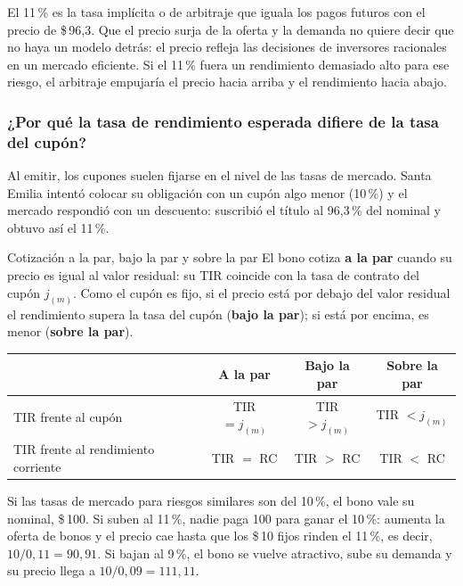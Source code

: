 El 11\,\% es la tasa implícita o de arbitraje que iguala los pagos futuros con el precio de \$\,96,3. Que el precio surja de la oferta y la demanda no quiere decir que no haya un modelo detrás: el precio refleja las decisiones de inversores racionales en un mercado eficiente. Si el 11\,\% fuera un rendimiento demasiado alto para ese riesgo, el arbitraje empujaría el precio hacia arriba y el rendimiento hacia abajo.

\subsubsection{¿Por qué la tasa de rendimiento esperada difiere de la tasa del cupón?}

Al emitir, los cupones suelen fijarse en el nivel de las tasas de mercado. Santa Emilia intentó colocar su obligación con un cupón algo menor (10\,\%) y el mercado respondió con un descuento: suscribió el título al 96,3\,\% del nominal y obtuvo así el 11\,\%.

\begin{definicion}{Cotización a la par, bajo la par y sobre la par}
El bono cotiza \textbf{a la par} cuando su precio es igual al valor residual: su TIR coincide con la tasa de contrato del cupón $j_{(m)}$. Como el cupón es fijo, si el precio está por debajo del valor residual el rendimiento supera la tasa del cupón (\textbf{bajo la par}); si está por encima, es menor (\textbf{sobre la par}).
\end{definicion}

\begin{center}
\small
\begin{tabular}{@{}lccc@{}}
\toprule
 & A la par & Bajo la par & Sobre la par\\
\midrule
TIR frente al cupón & TIR $= j_{(m)}$ & TIR $> j_{(m)}$ & TIR $< j_{(m)}$\\
TIR frente al rendimiento corriente & TIR $=$ RC & TIR $>$ RC & TIR $<$ RC\\
\bottomrule
\end{tabular}
\end{center}

\begin{ejemplo}
Si las tasas de mercado para riesgos similares son del 10\,\%, el bono vale su nominal, \$\,100. Si suben al 11\,\%, nadie paga 100 para ganar el 10\,\%: aumenta la oferta de bonos y el precio cae hasta que los \$\,10 fijos rinden el 11\,\%, es decir, $10/0{,}11 = 90{,}91$. Si bajan al 9\,\%, el bono se vuelve atractivo, sube su demanda y su precio llega a $10/0{,}09 = 111{,}11$.
\end{ejemplo}

